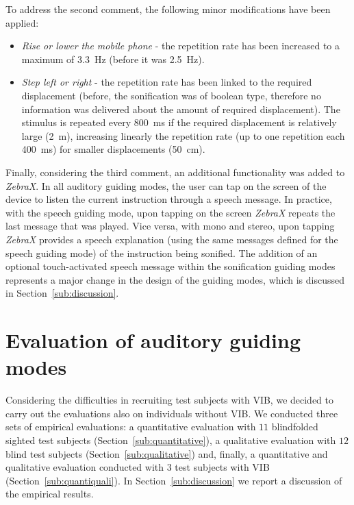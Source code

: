 \documentclass{article}
\newcommand{\zebra}{\emph{ZebraX}}
\begin{document}
To address the second comment, the following minor modifications have been applied:
\begin{itemize}
\item \emph{Rise or lower the mobile phone} - the repetition rate has been increased to a maximum of 3.3~Hz (before it was 2.5~Hz).
\item \emph{Step left or right} - the repetition rate has been linked to the required displacement (before, the sonification was of boolean type, therefore no information was delivered about the amount of required displacement). The stimulus is repeated every 800~ms if the required displacement is relatively large (2~m), increasing linearly the repetition rate (up to one repetition each 400~ms) for smaller displacements (50~cm).
\end{itemize}

Finally, considering the third comment, an additional functionality was added to \zebra{}. In all auditory guiding modes, the user can tap on the screen of the device to listen the current instruction through a speech message.
In practice, with the speech guiding mode, upon tapping on the screen \zebra{} repeats the last message that was played.
Vice versa, with mono and stereo, upon tapping \zebra{} provides a speech explanation (using the same messages defined for the speech guiding mode) of the instruction being sonified.
The addition of an optional touch-activated speech message within the sonification guiding modes represents a major change in the design of the guiding modes, which is discussed in Section~\ref{sub:discussion}.





\section{Evaluation of auditory guiding modes}
\label{sec:finalEval}
Considering the difficulties in recruiting test subjects with VIB, we decided to carry out the evaluations also on individuals without VIB.
We conducted three sets of empirical evaluations: a quantitative evaluation with $11$ blindfolded sighted test subjects (Section~\ref{sub:quantitative}), a qualitative evaluation with $12$ blind test subjects (Section~\ref{sub:qualitative}) and, finally, a quantitative and qualitative evaluation conducted with $3$ test subjects with VIB (Section~\ref{sub:quantiquali}).
In Section~\ref{sub:discussion} we report a discussion of the empirical results.
\end{document}
